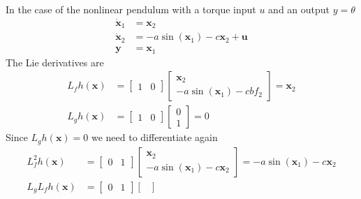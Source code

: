 \begin{examplesection}[Pendulum]
    In the case of the nonlinear pendulum with a torque input $u$ and an output $y=\theta$
    \begin{align*}
        \dot{\mathbf{x}}_1 & = \mathbf{x}_2                                      \\
        \dot{\mathbf{x}}_2 & = -a \sin(\mathbf{x}_1)-c \mathbf{x}_2 + \mathbf{u} \\
        \mathbf{y}         & = \mathbf{x}_1
    \end{align*}
    The Lie derivatives are
    \begin{align*}
        L_f h(\mathbf{x}) & = \begin{bmatrix}
                                  1 & 0
                              \end{bmatrix}
        \begin{bmatrix}
            \mathbf{x}_2 \\
            -a \sin(\mathbf{x}_1) -cbf  _2
        \end{bmatrix} = \mathbf{x}_2
        \\
        L_g h(\mathbf{x}) & = \begin{bmatrix}
                                  1 & 0
                              \end{bmatrix}
        \begin{bmatrix}
            0 \\
            1
        \end{bmatrix} = 0
    \end{align*}
    Since $L_g h(\mathbf{x}) = 0$ we need to differentiate again
    \begin{align*}
        L_f^2 h(\mathbf{x})   & = \begin{bmatrix}
                                      0 & 1
                                  \end{bmatrix}
        \begin{bmatrix}
            \mathbf{x}_2 \\
            -a \sin(\mathbf{x}_1) -c\mathbf{x}_2
        \end{bmatrix} = -a \sin(\mathbf{x}_1) -c \mathbf{x}_2
        \\
        L_g L_f h(\mathbf{x}) & = \begin{bmatrix}
                                      0 & 1
                                  \end{bmatrix}
        \begin{bmatrix}

\end{bmatrix}
\end{align*}
\end{examplesection}
